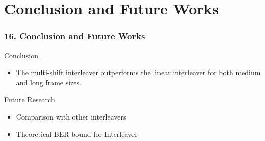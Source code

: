 \documentclass{beamer}  %
\begin{document}
\section{Conclusion and Future Works}
\begin{frame}
\frametitle{16. Conclusion and Future Works}
\begin{block}{Conclusion}
\begin{itemize}
\setlength\itemsep{2em}
\item The multi-shift
interleaver outperforms the linear interleaver for both medium and long frame sizes. 
\end{itemize}
\end{block}

\begin{block}{Future Research }



\begin{itemize}


\item Comparison with other interleavers

\item Theoretical BER bound for Interleaver







\end{itemize}
\end{block}
\end{frame}
\end{document}

